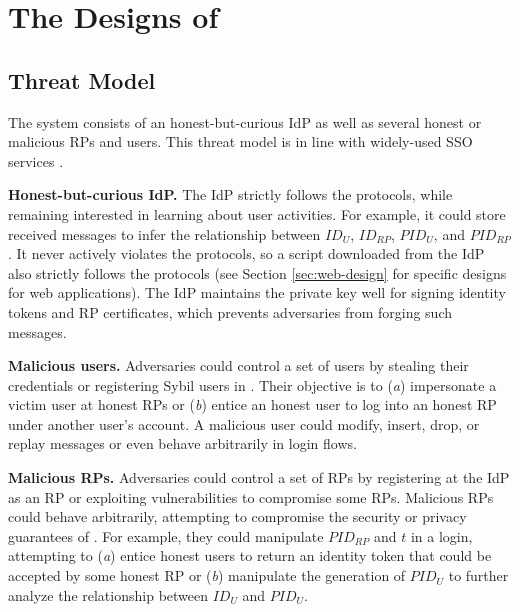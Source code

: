 \section{The Designs of \usso}
\label{sec:UPPRESSO}


\subsection{Threat Model}
\label{subsec:threatmodel}
The system consists of an honest-but-curious IdP as well as several honest or malicious RPs and users. This threat model is in line with widely-used SSO services \cite{OpenIDConnect,rfc6749, SAML, SAMLIdentifier}.

\noindent \textbf{Honest-but-curious IdP.} The IdP strictly follows the protocols,
 while remaining interested in learning about user activities.
For example, it could store received messages to infer the relationship between $ID_U$, $ID_{RP}$, $PID_{U}$, and $PID_{RP}$.
It never actively violates the protocols, so a script downloaded from the IdP also strictly follows the protocols (see Section \ref{sec:web-design} for specific designs for web applications).
The IdP maintains the private key well for signing identity tokens and RP certificates, %
which prevents adversaries from forging such messages.

\noindent \textbf{Malicious users.} Adversaries could control a set of users by stealing their credentials or registering Sybil users in \usso.
 Their objective \cite{SPRESSO, FettKS14} is to (\emph{a}) impersonate a victim user at honest RPs or (\emph{b}) entice an honest user to log into an honest RP under another user's account.
A malicious user could modify, insert, drop, or replay messages or even behave arbitrarily in login flows.

\noindent \textbf{Malicious RPs.}
Adversaries could control a set of RPs by registering at the IdP as an RP or exploiting vulnerabilities to compromise some RPs.
Malicious RPs could behave arbitrarily, attempting to compromise the security or privacy guarantees of \usso.
For example, they could manipulate $PID_{RP}$ and $t$ in a login, attempting to (\emph{a}) entice honest users to return an identity token that could be accepted by some honest RP or (\emph{b}) manipulate the generation of $PID_U$ to further analyze the relationship between $ID_U$ and $PID_U$.


